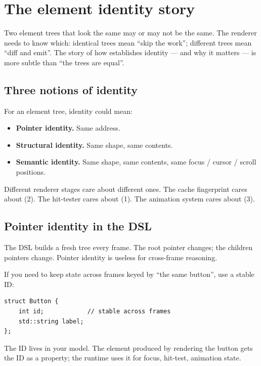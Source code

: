\chapter{The element identity story}
\label{ch:identity}

\begin{aside}
Two element trees that look the same may or may not be the same.
The renderer needs to know which: identical trees mean ``skip
the work''; different trees mean ``diff and emit''. The story
of how \maya{} establishes identity --- and why it matters ---
is more subtle than ``the trees are equal''.
\end{aside}

\section{Three notions of identity}

For an element tree, identity could mean:

\begin{itemize}[leftmargin=*]
  \item \textbf{Pointer identity.} Same address.
  \item \textbf{Structural identity.} Same shape, same contents.
  \item \textbf{Semantic identity.} Same shape, same contents,
    same focus / cursor / scroll positions.
\end{itemize}

Different renderer stages care about different ones. The cache
fingerprint cares about (2). The hit-tester cares about (1).
The animation system cares about (3).

\section{Pointer identity in the DSL}

The DSL builds a fresh tree every frame. The root pointer
changes; the children pointers change. Pointer identity is
useless for cross-frame reasoning.

If you need to keep state across frames keyed by ``the same
button'', use a stable ID:

\begin{lstlisting}
struct Button {
    int id;            // stable across frames
    std::string label;
};
\end{lstlisting}

The ID lives in your model. The element produced by rendering
the button gets the ID as a property; the runtime uses it for
focus, hit-test, animation state.

